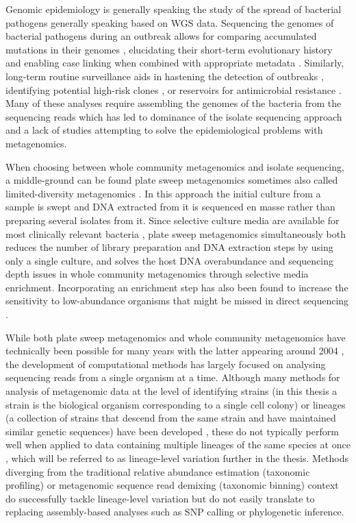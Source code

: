 \documentclass[officiallayout]{tktla}
\begin{document}
Genomic epidemiology is generally speaking the study of the spread of
bacterial pathogens generally speaking based on WGS data. Sequencing
the genomes of bacterial pathogens during an outbreak allows for
comparing accumulated mutations in their genomes
\citep{tang2017infection}, elucidating their short-term evolutionary
history and enabling case linking when combined with appropriate
metadata \citep{grad2014epidemiologic, hill2021progress}. Similarly,
long-term routine surveillance aids in hastening the detection of
outbreaks \citep{eyre2012pilot, gardy2018towards}, identifying
potential high-risk clones \citep{aanensen2016whole}, or reservoirs
for antimicrobial resistance \citep{weingarten2018genomic,
  coipan2020genomic}. Many of these analyses require assembling the
genomes of the bacteria from the sequencing reads which has led to
dominance of the isolate sequencing approach and a lack of studies
attempting to solve the epidemiological problems with metagenomics.

When choosing between whole community metagenomics and isolate sequencing, a
middle-ground can be found plate sweep metagenomics
\cite{maklin_high-resolution_2021} \textemdash{ } sometimes also
called limited-diversity metagenomics \citep{cocker_drivers_2022}. In
this approach the initial culture from a sample is swept and DNA
extracted from it is sequenced en masse rather than preparing several
isolates from it. Since selective culture media are available for most
clinically relevant bacteria \citep{lagier2015current}, plate sweep
metagenomics simultaneously both reduces the number of library
preparation and DNA extraction steps by using only a single culture,
and solves the host DNA overabundance and sequencing depth issues in
whole community metagenomics through selective media enrichment. Incorporating an
enrichment step has also been found to increase the sensitivity to
low-abundance organisms that might be missed in direct sequencing
\citep{whelan2020culture}.

While both plate sweep metagenomics and whole community metagenomics have
technically been possible for many years with the latter appearing
around 2004 \citep{tyson2004community, venter2004environmental}, the
development of computational methods has largely focused on analysing
sequencing reads from a single organism at a time. Although many
methods for analysis of metagenomic data at the level of identifying
strains (in this thesis a strain is the biological organism
corresponding to a single cell colony) or lineages (a collection of
strains that descend from the same strain and have maintained similar
genetic sequences) have been developed \citep{breitwieser2019review},
these do not typically perform well when applied to data containing
multiple lineages of the same species at once
\citep{sczyrba2017critical}, which will be referred to as
lineage-level variation further in the thesis. Methods diverging from
the traditional relative abundance estimation (taxonomic profiling)
\citep{truong2017microbial} or metagenomic sequence read demixing
(taxonomic binning) \citep{van2022strainge} context do successfully
tackle lineage-level variation but do not easily translate to replacing
assembly-based analyses such as SNP calling or phylogenetic inference.
\end{document}
